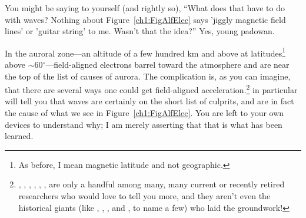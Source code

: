 You might be saying to yourself (and rightly so), ``What does that
have to do with \Alf waves? Nothing about Figure~\ref{ch1:FigAlfElec}
says 'jiggly magnetic field lines' or 'guitar string' to me. Wasn't
that the idea?'' Yes, young padowan. 

In the auroral zone---an altitude of a few hundred km and above at
latitudes\footnote{As before, I mean magnetic latitude and not geographic.}
above $\sim$60$^\circ$---field-aligned electrons barrel toward the atmosphere
and are near the top of the list of causes of aurora. The complication is, as
you can imagine, that there are several ways one could get field-aligned
acceleration.\footnote{\citet{Wygant2002}, \citet{Bostrom2003a},
  \citet{Morooka2004}, \citet{Newell2009}, \citet{Hull2010}, \citet{Mottez2016},
  are only a handful among many, many current or recently retired researchers
  who would love to tell you more, and they aren't even the historical giants
  (like \citet{Knight1973}, \citet{Evans1974}, \citet{Hasegawa1976}, and
  \citet{Lyons1980a}, to name a few) who laid the groundwork!}
\citet{Chaston2002,Chaston2003a,Chaston2007,Chaston2008} in particular will tell
you that \Alf waves are certainly on the short list of culprits, and are in fact
the cause of what we see in Figure~\ref{ch1:FigAlfElec}. You are left to your
own devices to understand why; I am merely asserting that that is what has been
learned.








